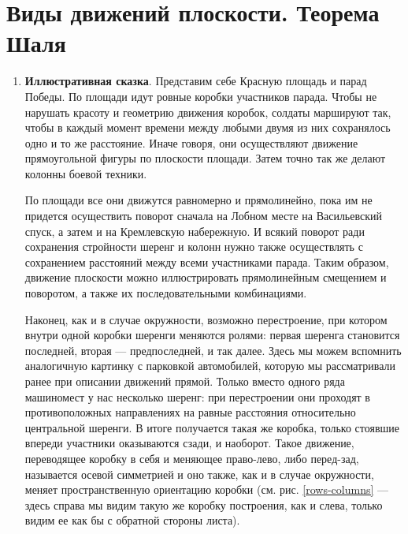 
\section{Виды движений плоскости. Теорема Шаля}


\begin{enumerate}
\item \textbf{Иллюстративная сказка}. Представим себе Красную площадь и парад Победы. По площади идут ровные коробки участников парада. Чтобы не нарушать красоту и геометрию движения коробок, солдаты маршируют так, чтобы в каждый момент времени между любыми двумя из них сохранялось одно и то же расстояние. Иначе говоря, они осуществляют движение прямоугольной фигуры по плоскости площади. Затем точно так же делают колонны боевой техники.

По площади все они движутся равномерно и прямолинейно, пока им не придется осуществить поворот сначала на Лобном месте на Васильевский спуск, а затем и на Кремлевскую набережную. И всякий поворот ради сохранения стройности шеренг и колонн нужно также осуществлять с сохранением расстояний между всеми участниками парада. Таким образом, движение плоскости можно иллюстрировать прямолинейным смещением и поворотом, а также их последовательными комбинациями.

Наконец, как и в случае окружности, возможно перестроение, при котором внутри одной коробки шеренги меняются ролями: первая шеренга становится последней, вторая --- предпоследней, и так далее. Здесь мы можем вспомнить аналогичную картинку с парковкой автомобилей, которую мы рассматривали ранее при описании движений прямой. Только вместо одного ряда машиномест у нас несколько шеренг: при перестроении они проходят в противоположных направлениях на равные расстояния относительно центральной шеренги. В итоге получается такая же коробка, только стоявшие впереди участники оказываются сзади, и наоборот. Такое движение, переводящее коробку в себя и меняющее право-лево, либо перед-зад, называется осевой симметрией и оно также, как и в случае окружности, меняет пространственную ориентацию коробки (см. рис. \ref{rows-columns} --- здесь справа мы видим такую же коробку построения, как и слева, только видим ее как бы с обратной стороны листа).


\end{enumerate}
